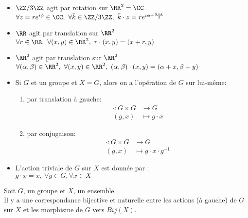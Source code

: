 \documentclass[../main.tex]{subfile}
\begin{document}
\begin{ex}
\phantom{a}
\begin{itemize}	
	\item $\ZZ/3\ZZ$ agit par rotation sur $\RR^2 = \CC$.\\
	$\forall z = re^{i\phi} \in \CC, \ \forall \bar{k} \in \ZZ/3\ZZ, \ \bar{k} \cdot z = re^{i\phi + \frac{2\pi k}{3}}$\\

\begin{center}	
	\def\svgwidth{0.3\textwidth}
	
\end{center}

	\item $\RR$ agit par translation sur $\RR^2$\\
	$\forall r \in \RR, \ \forall (x, y) \in \RR^2, \ r \cdot (x, y) = (x+r, y)$

	\item $\RR^2$ agit par translation sur $\RR^2$\\
	$\forall (\alpha, \beta) \in \RR^2, \ \forall (x, y) \in \RR^2, \ (\alpha, \beta) \cdot (x, y) = (\alpha + x, \beta + y)$

	\item Si $G$ et un groupe et $X = G$, alors on a l'opération de $G$ sur lui-même:\\
	\begin{enumerate}	
		\item par translation à gauche:
		$$
	\begin{aligned}
		\cdot : G \times G &\to G\\
		(g, x) &\mapsto g \cdot x
	\end{aligned}
		$$

		\item par conjugaison:
		$$
	\begin{aligned}
		\cdot : G \times G &\to G\\
		(g, x) &\mapsto g \cdot x \cdot g^{-1}
	\end{aligned}
		$$
	\end{enumerate}

	\item L'action triviale de $G$ sur $X$ est donnée par :\\
	$g \cdot x = x, \ \forall g \in G, \forall x \in X$
\end{itemize}
\end{ex}

\begin{prop}
	Soit $G$, un groupe et $X$, un ensemble.\\
	Il y a une correspondance bijective et naturelle entre les actions (à gauche) de $G$ sur $X$ et les morphisme de $G$ vers $Bij (X)$.
\end{prop}
\end{document}
